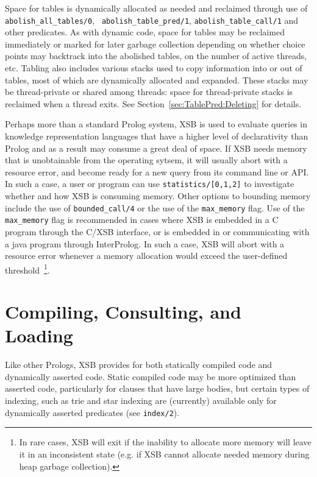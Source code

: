 Space for tables is dynamically allocated as needed and reclaimed
through use of {\tt abolish\_all\_tables/0}, {\tt
  abolish\_table\_pred/1}, {\tt abolish\_table\_call/1} and other
predicates.  As with dynamic code, space for tables may be reclaimed
immediately or marked for later garbage collection depending on
whether choice points may backtrack into the abolished tables, on the
number of active threads, etc.  Tabling also includes various stacks
used to copy information into or out of tables, most of which are
dynamically allocated and expanded.  These stacks may be
thread-private or shared among threads: space for thread-private
stacks is reclaimed when a thread exits.  See
Section~\ref{sec:TablePred:Deleting} for details.

Perhaps more than a standard Prolog system, XSB is used to evaluate
queries in knowledge representation languages that have a higher level
of declarativity than Prolog and as a result may consume a great deal
of space.  If XSB needs memory that is unobtainable from the operating
sytsem, it will usually abort with a resource error, and become ready
for a new query from its command line or API.  In such a case, a user
or program can use {\tt statistics/[0,1,2]} to investigate whether and
how XSB is consuming memory.  Other options to bounding memory include
the use of {\tt bounded\_call/4} or the use of the {\tt max\_memory}
flag.  Use of the {\tt max\_memory} flag is recommended in cases where
XSB is embedded in a C program through the C/XSB interface, or is
embedded in or communicating with a java program through InterProlog.
In such a case, XSB will abort with a resource error whenever a memory
allocation would exceed the user-defined threshold~\footnote{In rare
  cases, XSB will exit if the inability to allocate more memory will
  leave it in an inconsistent state (e.g. if XSB cannot allocate
  needed memory during heap garbage collection).}.

\section{Compiling, Consulting, and Loading} \label{Consulting}
Like other Prologs, XSB provides for both statically compiled code and
dynamically asserted code.  Static compiled code may be more optimized
than asserted code, particularly for clauses that have large bodies,
but certain types of indexing, such as trie and star indexing are
(currently) available only for dynamically asserted predicates (see
{\tt index/2}).

